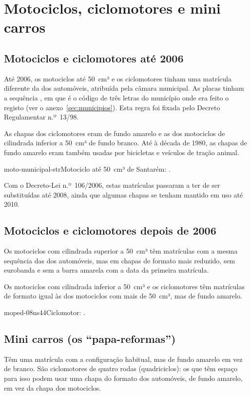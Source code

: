 \section{Motociclos, ciclomotores e mini carros}

\subsection{Motociclos e ciclomotores até 2006}

Até 2006, os motociclos até 50~cm³ e os ciclomotores tinham uma matrícula
diferente da dos automóveis, atribuída pela câmara municipal. As placas tinham a
sequência , em que  é o código de três letras do
município onde era feito o registo (ver o anexo~\ref{sec:municipios}). Esta
regra foi fixada pelo Decreto Regulamentar n.º~13/98.

As chapas dos ciclomotores eram de fundo amarelo e as dos motociclos de
cilindrada inferior a 50~cm³ de fundo branco. Até à década de 1980, as chapas de
fundo amarelo eram também usadas por bicicletas e veículos de tração animal.

%
          {moto-municipal-str}{Motociclo até 50~cm³ de Santarém: .}

Com o Decreto-Lei n.º~106/2006, estas matrículas passaram a ter de ser
substituídas até 2008, ainda que algumas chapas se tenham mantido em uso até
2010.

\subsection{Motociclos e ciclomotores depois de 2006}

Os motociclos com cilindrada superior a 50~cm³ têm matrículas com a mesma
sequência das dos automóveis, mas em chapas de formato mais reduzido, sem
eurobanda e sem a barra amarela com a data da primeira matrícula.

Os motociclos com cilindrada inferior a 50~cm³ e os ciclomotores têm matrículas
de formato igual às dos motociclos com mais de 50~cm³, mas de fundo amarelo.

%
          {moped-08ns44}{Ciclomotor: .}


\subsection{Mini carros (os “papa-reformas”)}

Têm uma matrícula com a configuração habitual, mas de fundo amarelo em vez de
branco. São ciclomotores de quatro rodas (quadriciclos): os que têm espaço para
isso podem usar uma chapa do formato dos automóveis, de fundo amarelo, em vez da
chapa dos motociclos.

